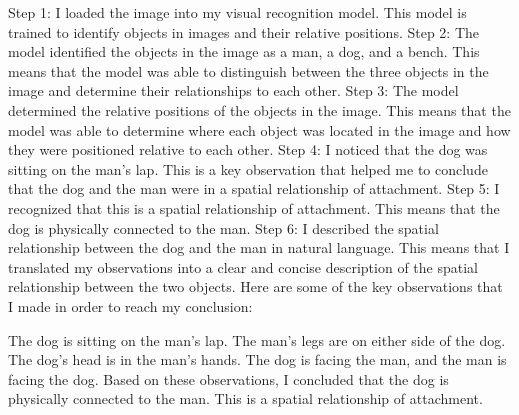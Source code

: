 \begin{enumerate}
\begin{enumerate}
        Step 1: I loaded the image into my visual recognition model. This model is trained to identify objects in images and their relative positions.
        Step 2: The model identified the objects in the image as a man, a dog, and a bench. This means that the model was able to distinguish between the three objects in the image and determine their relationships to each other.
        Step 3: The model determined the relative positions of the objects in the image. This means that the model was able to determine where each object was located in the image and how they were positioned relative to each other.
        Step 4: I noticed that the dog was sitting on the man's lap. This is a key observation that helped me to conclude that the dog and the man were in a spatial relationship of attachment.
        Step 5: I recognized that this is a spatial relationship of attachment. This means that the dog is physically connected to the man.
        Step 6: I described the spatial relationship between the dog and the man in natural language. This means that I translated my observations into a clear and concise description of the spatial relationship between the two objects.
        Here are some of the key observations that I made in order to reach my conclusion:
        
        The dog is sitting on the man's lap.
        The man's legs are on either side of the dog.
        The dog's head is in the man's hands.
        The dog is facing the man, and the man is facing the dog.
        Based on these observations, I concluded that the dog is physically connected to the man. This is a spatial relationship of attachment.
        

\end{enumerate}
\end{enumerate}

